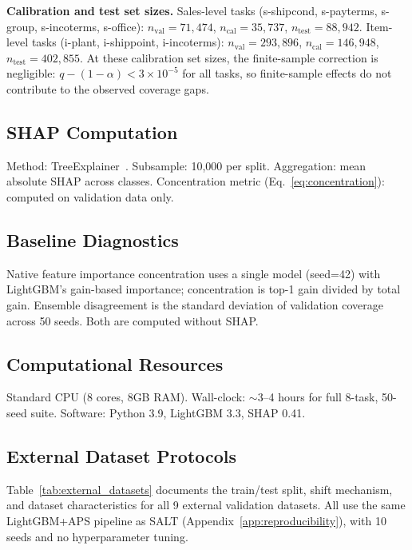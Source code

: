 \documentclass{uai2026} %
\begin{document}
\noindent\textbf{Calibration and test set sizes.} Sales-level tasks (s-shipcond, s-payterms, s-group, s-incoterms, s-office): $n_{\text{val}} = 71{,}474$, $n_{\text{cal}} = 35{,}737$, $n_{\text{test}} = 88{,}942$. Item-level tasks (i-plant, i-shippoint, i-incoterms): $n_{\text{val}} = 293{,}896$, $n_{\text{cal}} = 146{,}948$, $n_{\text{test}} = 402{,}855$. At these calibration set sizes, the finite-sample correction is negligible: $q - (1-\alpha) < 3 \times 10^{-5}$ for all tasks, so finite-sample effects do not contribute to the observed coverage gaps.

\subsection{SHAP Computation}

Method: TreeExplainer~\citep{lundberg2020local}. Subsample: 10,000 per split. Aggregation: mean absolute SHAP across classes. Concentration metric (Eq.~\ref{eq:concentration}): computed on validation data only.

\subsection{Baseline Diagnostics}

Native feature importance concentration uses a single model (seed=42) with LightGBM's gain-based importance; concentration is top-1 gain divided by total gain. Ensemble disagreement is the standard deviation of validation coverage across 50 seeds. Both are computed without SHAP.

\subsection{Computational Resources}

Standard CPU (8 cores, 8GB RAM). Wall-clock: $\sim$3--4 hours for full 8-task, 50-seed suite. Software: Python 3.9, LightGBM 3.3, SHAP 0.41.

\subsection{External Dataset Protocols}\label{app:external_data}

Table~\ref{tab:external_datasets} documents the train/test split, shift mechanism, and dataset characteristics for all 9 external validation datasets. All use the same LightGBM+APS pipeline as SALT (Appendix~\ref{app:reproducibility}), with 10 seeds and no hyperparameter tuning.
\end{document}
